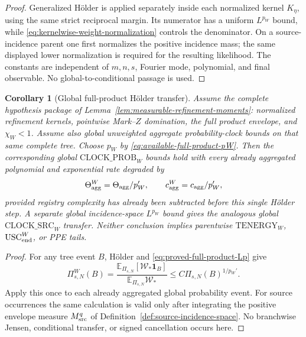 \documentclass[11pt]{article}
\newtheorem{corollary}[theorem]{Corollary}
\newcommand{\one}{\mathbf 1}
\begin{document}
\begin{proof}
Generalized H\"older is applied separately inside each normalized kernel
$K_\eta$, using the same strict reciprocal margin.  Its numerator has a
uniform $L^{p_W}$ bound, while
\eqref{eq:kernelwise-weight-normalization} controls the denominator.  On a
source-incidence parent one first normalizes the positive incidence mass;
the same displayed lower normalization is required for the resulting
likelihood.  The
constants are independent of $m,n,s$, Fourier mode, polynomial, and final
observable.  No global-to-conditional passage is used.
\end{proof}

\begin{corollary}[Global full-product H\"older transfer]
\label{cor:full-product-holder-energy}
Assume the complete hypothesis package of
Lemma~\ref{lem:measurable-refinement-moments}: normalized refinement
kernels, pointwise Mark--$Z$ domination, the full product envelope, and
$\chi_W<1$.  Assume also global unweighted aggregate
probability-clock bounds on that same complete tree.  Choose $p_W$ by
\eqref{eq:available-full-product-pW}.  Then the corresponding global
\(\mathrm{CLOCK\_PROB}_{W}\) bounds hold with every already aggregated
polynomial and exponential rate degraded by
\[
 \Theta_{\rm agg}^{W}=\Theta_{\rm agg}/p_W',\qquad
 c_{\rm agg}^{W}=c_{\rm agg}/p_W',
\]
provided registry complexity has already been subtracted before this single
H\"older step.  A separate global incidence-space $L^{p_W}$ bound gives the
analogous global \(\mathrm{CLOCK\_SRC}_{W}\) transfer.  Neither conclusion
implies parentwise \(\mathrm{TENERGY}_{W}\), \(\mathrm{USC}_{\rm end}^{W}\),
or PPE tails.
\end{corollary}

\begin{proof}
For any tree event $B$, H\"older and
\eqref{eq:proved-full-product-Lp} give
\[
 \Pi_{s,N}^{W}(B)
 =\frac{\mathbb E_{\Pi_{s,N}}[\mathscr W_*\one_B]}
        {\mathbb E_{\Pi_{s,N}}\mathscr W_*}
 \le C\Pi_{s,N}(B)^{1/p_W'}.
\]
Apply this once to each already aggregated global probability event.  For
source occurrences the same calculation is valid only after integrating
the positive envelope measure $M_{\rm src}^{q}$ of
Definition~\ref{def:source-incidence-space}.  No branchwise Jensen,
conditional transfer, or signed cancellation occurs here.
\end{proof}
\end{document}
